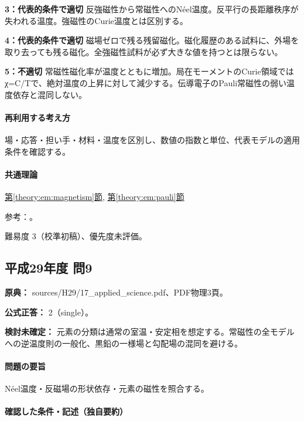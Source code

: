 \noindent\textbf{3：代表的条件で適切} 反強磁性から常磁性へのNéel温度。反平行の長距離秩序が失われる温度。強磁性のCurie温度とは区別する。\par

\noindent\textbf{4：代表的条件で適切} 磁場ゼロで残る残留磁化。磁化履歴のある試料に、外場を取り去っても残る磁化。全強磁性試料が必ず大きな値を持つとは限らない。\par

\noindent\textbf{5：不適切} 常磁性磁化率が温度とともに増加。局在モーメントのCurie領域ではχ=C/Tで、絶対温度の上昇に対して減少する。伝導電子のPauli常磁性の弱い温度依存と混同しない。\par

\paragraph{再利用する考え方} 場・応答・担い手・材料・温度を区別し、数値の指数と単位、代表モデルの適用条件を確認する。

\paragraph{共通理論} \hyperref[theory:em:magnetism]{第\ref*{theory:em:magnetism}節}, \hyperref[theory:em:pauli]{第\ref*{theory:em:pauli}節}

\par 参考：\cite{openstax_magnetism,em51_pauli}。

\par 難易度 3（校準初稿）、優先度未評価。

\subsection{平成29年度 問9}
\label{q:h29-reg-applied-09}

\noindent\textbf{原典：} sources/H29/17\_applied\_science.pdf、PDF物理3頁。

\textbf{公式正答：} 2（single）。

\par\textbf{検討未確定：} 元素の分類は通常の室温・安定相を想定する。常磁性の全モデルへの逆温度則の一般化、黒鉛の一様場と勾配場の混同を避ける。

\paragraph{問題の要旨} Néel温度・反磁場の形状依存・元素の磁性を照合する。

\paragraph{確認した条件・記述（独自要約）}\mbox{}\par

